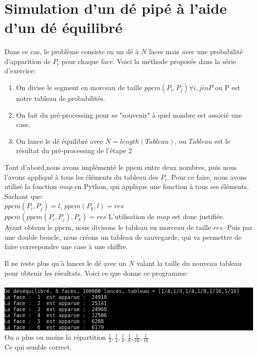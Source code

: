 \documentclass[a4paper, 11pt]{article}
\begin{document}
\section{Simulation d'un dé pipé à l'aide d'un dé équilibré}
\paragraph{}
Dans ce cas, le problème consiste en un dé à $N$ faces mais avec une probabilité d'apparition de $P_i$ pour chaque face.
Voici la méthode proposée dans la série d'exercice:
\begin{enumerate}
 \item On divise le segment en morceau de taille $ppcm(P_i,P_j) \forall i,j in P$ ou P est notre tableau de probabilités.
 \item On fait du pré-processing pour se "souvenir" à quel nombre est associé une case.
 \item On lance le dé équilibré avec $N = length(Tableau)$, ou $Tableau$ est le résultat du pré-processing de l'étape 2
\end{enumerate}

Tout d'abord,nous avons implémenté le ppcm entre deux nombres, puis nous l'avons appliqué à tous les éléments du tableau des $P_i$.
Pour ce faire, nous avons utilisé la fonction $map$ en Python, qui applique une fonction à tous ses éléments.
Sachant que:\\
$ppcm(P_i,P_j) = l$, $ppcm(P_k,l) = res$\\
$ppcm(ppcm(P_i,P_j),P_k) = res$
L'utilisation de $map$ est donc justifiée.\\
Ayant obtenu le ppcm, nous divisons le tableau en morceau de taille $res$.
Puis par une double boucle, nous créons un tableau de sauvegarde, qui va permettre de faire correspondre une case à une chiffre.

Il ne reste plus qu'à lancer le dé avec un $N$ valant la taille du nouveau tableau pour obtenir les résultats.
Voici ce que donne ce programme:\\
\\
\includegraphics[scale=0.6]{de_pipe_de}
\\
On a plus ou moins la répartition $\frac{1}{4},\frac{1}{4},\frac{1}{4},\frac{1}{8},\frac{1}{16},\frac{1}{16}$\\
Ce qui semble correct.
\end{document}
